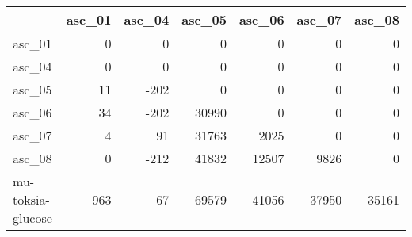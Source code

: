 \begin{tabular}{lrrrrrr}
\toprule
 & asc_01 & asc_04 & asc_05 & asc_06 & asc_07 & asc_08 \\
\midrule
asc_01 & 0 & 0 & 0 & 0 & 0 & 0 \\
asc_04 & 0 & 0 & 0 & 0 & 0 & 0 \\
asc_05 & 11 & -202 & 0 & 0 & 0 & 0 \\
asc_06 & 34 & -202 & 30990 & 0 & 0 & 0 \\
asc_07 & 4 & 91 & 31763 & 2025 & 0 & 0 \\
asc_08 & 0 & -212 & 41832 & 12507 & 9826 & 0 \\
mu-toksia-glucose & 963 & 67 & 69579 & 41056 & 37950 & 35161 \\
\bottomrule
\end{tabular}
